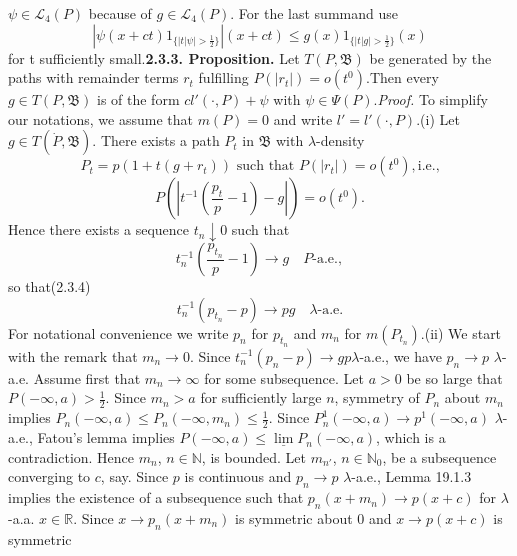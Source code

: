 \documentclass[12pt,reqno]{amsart} %
\begin{document}
$\psi \in \mathcal{L}_4(P)$  because of  $g \in \mathcal{L}_4(P)$. For the last summand use
\[|\psi(x+ct)1_{\{|t|\psi|>\frac{1}{2}\}}| (x+ct) \leq
g(x)1_{\{|t|g|>\frac{1}{2}\}}(x)\]for t sufficiently
small.\textbf{2.3.3. Proposition.} Let $T(P,\mathfrak{B})$ be
generated by the paths with remainder terms $r_t$ fulfilling $P(|r_t|)
= o(t^0)$.Then every $g \in T(P, \mathfrak{B})$ is of the form
$cl'(\cdot, P) + \psi$ with $\psi \in \Psi(P)$.\textit{Proof.} To
simplify our notations, we assume that $m(P) = 0$ and write $l' =
l'(\cdot, P)$.(i) Let $g \in T(\dot{P},\mathfrak{B})$. There exists a
path $P_t$ in $\mathfrak{B}$ with $\lambda$-density\[P_t = p(1 + t(g +
r_t)) \text{ such that } P(|r_t|) = o(t^0), \text{
i.e.,}\]\[P(|t^{-1}(\frac{p_t}{p} - 1) - g|) = o(t^0).\]Hence there
exists a sequence $t_n \downarrow 0$ such
that\[t_n^{-1}(\frac{p_{t_n}}{p} - 1) \to g \quad P\text{-a.e.},\]so
that(2.3.4)\[t_n^{-1}(p_{t_n} - p) \to pg \quad
\lambda\text{-a.e.}\]For notational convenience we write $p_n$ for
$p_{t_n}$ and $m_n$ for $m(P_{t_n})$.(ii) We start with the remark
that $m_n \to 0$. Since $t_n^{-1}(p_n - p) \to gp$$\lambda$-a.e., we
have $p_n \to p$ $\lambda$-a.e. Assume first that $m_n \to \infty$ for
some subsequence. Let $a > 0$ be so large that $P(-\infty, a) >
\frac{1}{2}$. Since $m_n > a$ for sufficiently large $n$, symmetry of
$P_n$ about $m_n$ implies $P_n(-\infty, a) \leq P_n(-\infty, m_n) \leq
\frac{1}{2}$. Since $P_n^1(-\infty, a) \to p^1(-\infty, a)$
$\lambda$-a.e., Fatou's lemma implies $P(-\infty, a) \leq
\underline{\lim} P_n(-\infty, a)$, which is a contradiction. Hence
$m_n$, $n \in \mathbb{N}$, is bounded. Let $m_{n'}$, $n \in
\mathbb{N}_0$, be a subsequence converging to $c$, say. Since $p$ is
continuous and $p_n \to p$ $\lambda$-a.e., Lemma 19.1.3 implies the
existence of a subsequence such that $p_n(x + m_n) \to p(x+c)$ for
$\lambda$-a.a. $x \in \mathbb{R}$. Since $x \to p_n(x + m_n)$ is
symmetric about $0$ and $x \to p(x+c)$ is symmetric
\end{document}

